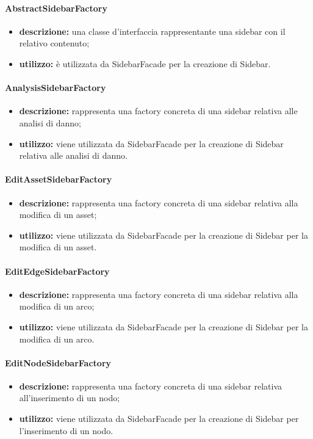 \paragraph{AbstractSidebarFactory}
\begin{itemize}
	\item \textbf{descrizione:} una classe d'interfaccia rappresentante una sidebar con il relativo contenuto;
	\item \textbf{utilizzo:} è utilizzata da SidebarFacade per la creazione di Sidebar.
\end{itemize}
\paragraph{AnalysisSidebarFactory}
\begin{itemize}
	\item \textbf{descrizione:} rappresenta una factory concreta di una sidebar relativa alle analisi di danno;
	\item \textbf{utilizzo:} viene utilizzata da SidebarFacade per la creazione di Sidebar relativa alle analisi di danno.
\end{itemize}
\paragraph{EditAssetSidebarFactory}
\begin{itemize}
	\item \textbf{descrizione:} rappresenta una factory concreta di una sidebar relativa alla modifica di un asset;
	\item \textbf{utilizzo:} viene utilizzata da SidebarFacade per la creazione di Sidebar per la modifica di un asset.
\end{itemize}
\paragraph{EditEdgeSidebarFactory}
\begin{itemize}
	\item \textbf{descrizione:} rappresenta una factory concreta di una sidebar relativa alla modifica di un arco;
	\item \textbf{utilizzo:} viene utilizzata da SidebarFacade per la creazione di Sidebar per la modifica di un arco.
\end{itemize}
\paragraph{EditNodeSidebarFactory}
\begin{itemize}
	\item \textbf{descrizione:} rappresenta una factory concreta di una sidebar relativa all'inserimento di un nodo;
	\item \textbf{utilizzo:} viene utilizzata da SidebarFacade per la creazione di Sidebar per l'inserimento di un nodo.
\end{itemize}
